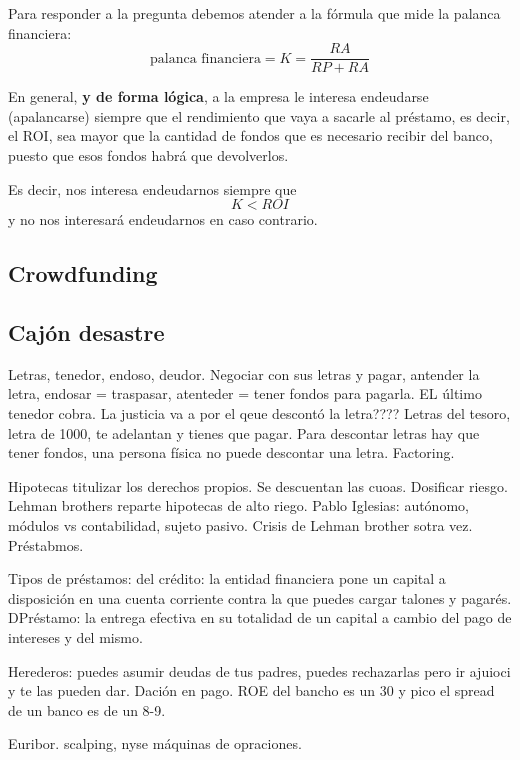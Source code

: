 \documentclass[nochap,palatino,shortheader]{apuntes}
\begin{document}
Para responder a la pregunta debemos atender a la fórmula que mide la palanca financiera:
\[\text{palanca financiera} = K = \frac{RA}{RP+RA}\]

En general, \textbf{y de forma lógica}, a la empresa le interesa endeudarse (apalancarse) siempre que el rendimiento que vaya a sacarle al préstamo, es decir, el ROI, sea mayor que la cantidad de fondos que es necesario recibir del banco, puesto que esos fondos habrá que devolverlos.

Es decir, nos interesa endeudarnos siempre que
\[K < ROI\]
y no nos interesará endeudarnos en caso contrario.

\subsection{Crowdfunding}

\subsection{Cajón desastre}


Letras, tenedor, endoso, deudor. Negociar con sus letras y pagar, antender la letra, endosar = traspasar, atenteder = tener fondos para pagarla. EL último tenedor cobra. La justicia va a por el qeue descontó la letra????  Letras del tesoro, letra de 1000, te adelantan y tienes que pagar. Para descontar letras hay que tener fondos, una persona física no puede descontar una letra. Factoring.

Hipotecas titulizar los derechos propios. Se descuentan las cuoas. Dosificar riesgo. Lehman brothers reparte hipotecas de alto riego. Pablo Iglesias: autónomo, módulos vs contabilidad, sujeto pasivo. Crisis de Lehman brother sotra vez. Préstabmos.

Tipos de préstamos: del crédito: la entidad financiera pone un capital a disposición en una cuenta corriente contra la que puedes cargar talones y pagarés. DPréstamo: la entrega efectiva en su totalidad de un capital a cambio del pago de intereses y del mismo.

Herederos: puedes asumir deudas de tus padres, puedes rechazarlas pero ir ajuioci y te las pueden dar. Dación en pago. ROE del bancho es un 30 y pico el spread de un banco es de un 8-9.

Euribor.  scalping, nyse máquinas de opraciones.
\end{document}
